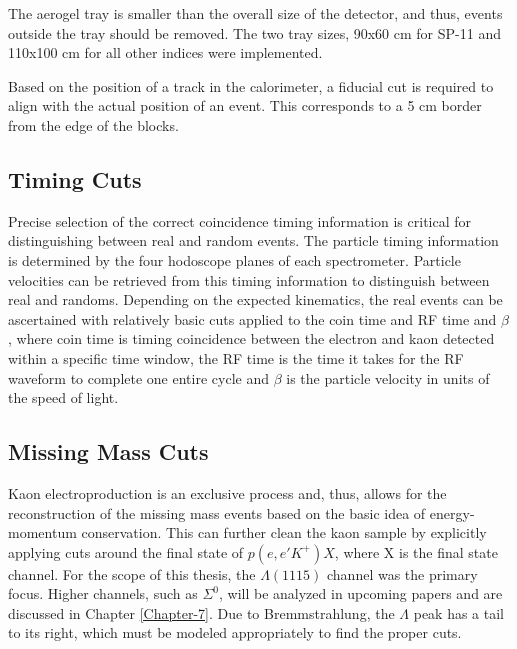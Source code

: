 \documentclass[
]{report}
\begin{document}
The aerogel tray is smaller than the overall size of the detector, and
thus, events outside the tray should be removed. The two tray sizes,
90x60 cm for SP-11 and 110x100 cm for all other indices were
implemented.

Based on the position of a track in the calorimeter, a fiducial cut is
required to align with the actual position of an event. This corresponds
to a 5 cm border from the edge of the blocks.

\hypertarget{timing-cuts}{%
\subsection{Timing Cuts}\label{timing-cuts}}



Precise selection of the correct coincidence timing information is
critical for distinguishing between real and random events. The particle
timing information is determined by the four hodoscope planes of each
spectrometer. Particle velocities can be retrieved from this timing
information to distinguish between real and randoms. Depending on the
expected kinematics, the real events can be ascertained with relatively
basic cuts applied to the coin time and RF time and \(\beta\), where
coin time is timing coincidence between the electron and kaon detected
within a specific time window, the RF time is the time it takes for the
RF waveform to complete one entire cycle and \(\beta\) is the particle
velocity in units of the speed of light.



\hypertarget{missing-mass-cuts}{%
\subsection{\texorpdfstring{Missing Mass Cuts
\label{Chapter-3-3-4}}{Missing Mass Cuts }}\label{missing-mass-cuts}}

Kaon electroproduction is an exclusive process and, thus, allows for the
reconstruction of the missing mass events based on the basic idea of
energy-momentum conservation. This can further clean the kaon sample by
explicitly applying cuts around the final state of \(p(e, e' K^+)X\),
where X is the final state channel. For the scope of this thesis, the
\(\Lambda(1115)\) channel was the primary focus. Higher channels, such
as \(\Sigma^0\), will be analyzed in upcoming papers and are discussed
in Chapter \ref{Chapter-7}. Due to Bremmstrahlung, the \(\Lambda\) peak
has a tail to its right, which must be modeled appropriately to find the
proper cuts.
\end{document}
